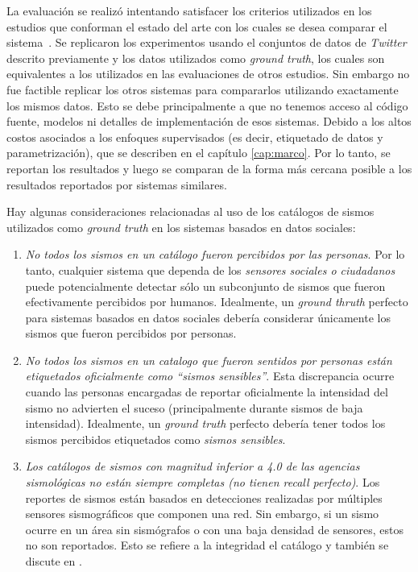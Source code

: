 La evaluación se realizó intentando satisfacer los criterios utilizados en los estudios que conforman el estado del arte con los cuales se desea comparar el sistema~\cite{sakaki2010earthquake,avvenuti2014ears,robinson2013sensitive,earle2012twitter}. Se replicaron los experimentos usando el conjuntos de datos de \textit{Twitter} descrito previamente y los datos utilizados como \textit{ground truth}, los cuales son equivalentes a los utilizados en las evaluaciones de otros estudios. Sin embargo no fue factible replicar los otros sistemas para compararlos utilizando exactamente los mismos datos. Esto se debe principalmente a que no tenemos acceso al código fuente, modelos ni detalles de implementación de esos sistemas. Debido a los altos costos asociados a los enfoques supervisados (es decir, etiquetado de datos y parametrización), que se describen en el capítulo \ref{cap:marco}. Por lo tanto, se reportan los resultados y luego se comparan de la forma más cercana posible a los resultados reportados por sistemas similares.

Hay algunas consideraciones relacionadas al uso de los catálogos de sismos utilizados como \textit{ground truth} en los sistemas basados en datos sociales:

\begin{enumerate}

\item  \textit{No todos los sismos en un catálogo fueron percibidos por las personas}. Por lo tanto, cualquier sistema que dependa de los \textit{sensores sociales o ciudadanos} puede potencialmente detectar sólo  un subconjunto de sismos que fueron efectivamente percibidos por humanos. Idealmente, un \textit{ground thruth} perfecto para sistemas basados en datos sociales debería considerar únicamente los sismos que fueron percibidos por personas. 

\item \textit{No todos los sismos en un catalogo que fueron sentidos por personas están etiquetados oficialmente como ``sismos sensibles''}. Esta discrepancia ocurre cuando las personas encargadas de reportar oficialmente la intensidad del sismo no advierten el suceso (principalmente durante sismos de baja intensidad). Idealmente, un \textit{ground truth} perfecto debería tener todos los sismos percibidos etiquetados como \textit{sismos sensibles}. 

\item \textit{Los catálogos de sismos con magnitud inferior a 4.0 de las agencias sismológicas no están siempre completas (no tienen \textit{recall} perfecto)}. Los reportes de sismos están basados en detecciones realizadas por múltiples sensores sismográficos que componen una red. Sin embargo, si un sismo ocurre en un área sin sismógrafos o con una baja densidad de sensores, estos no son reportados. Esto se refiere a la integridad el catálogo y también se discute en \cite{earle2010omg}. 
\end{enumerate}

